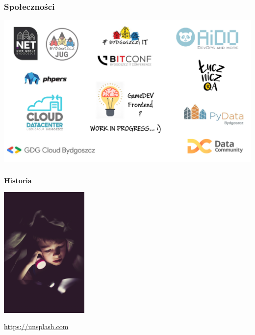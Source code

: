 \documentclass{beamer}
\newcommand{\source}[2]{
	\begin{flushright}
		\hfill {\scriptsize \href{#1}{#2}}	
	\end{flushright}
}
\begin{document}

\begin{frame}
\frametitle{\textbf{Społeczności}}

    \includegraphics[width=\textwidth]{community.png}

\end{frame}

\begin{frame}
\frametitle{\textbf{}}

\begin{minipage}{0.45\textwidth}
\begin{center}
    {\fontsize{30}{40}\selectfont \textbf{Historia}}
\end{center}
\end{minipage}
\begin{minipage}{0.45\textwidth}
    \hspace{15mm}
    \includegraphics[height=65mm]{story.jpg}
    \source{https://unsplash.com/photos/UYNH5VCsYPU}{https://unsplash.com}
\end{minipage}

\end{frame}
\end{document}
